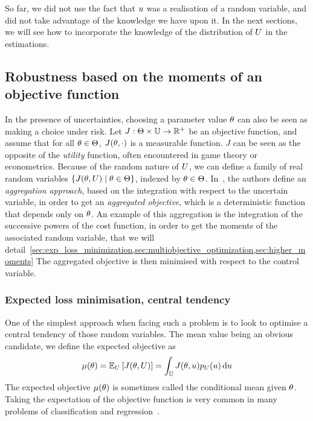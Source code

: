 \documentclass[../../Main_ManuscritThese.tex]{subfiles}
\begin{document}
So far, we did not use the fact that $u$ was a realisation of a
random variable, and did not take advantage of the knowledge we have
upon it. In the next sections, we will see how to incorporate the
knowledge of the distribution of $U$ in the estimations.

\subsection{Robustness based on the moments of an objective function}
In the presence of uncertainties, choosing a parameter value $\theta$ can
also be seen as making a choice under risk. Let
$J:\Theta \times \mathbb{U}\rightarrow \mathbb{R}^+$ be an objective
function, and assume that for all $\theta \in \Theta$, $J(\theta, \cdot)$
is a measurable function.  $J$ can be seen as the opposite of the
\emph{utility} function, often encountered in game theory or
econometrics.  Because of the random nature of $U$, we can define a
family of real random variables $\{J(\theta,U) \mid \theta \in \Theta\}$,
indexed by $\theta \in \Theta$.  In~\cite{beyer_robust_2007}, the
authors define an \emph{aggregation approach}, based on the
integration with respect to the uncertain variable, in order to get an
\emph{aggregated objective}, which is a deterministic function that
depends only on $\theta$.  An example of this aggregation is the
integration of the successive powers of the cost function, in order to
get the moments of the associated random variable, that we will
detail~\cref{sec:exp_loss_minimization,sec:multiobjective_optimization,sec:higher_moments} %
The aggregated objective is then minimised with respect to the control
variable.
\subsubsection{Expected loss minimisation, central tendency}
\label{sec:exp_loss_minimization}
One of the simplest approach when facing such a problem is to look to
optimise a central tendency of those random variables. The mean value
being an obvious candidate, we define the expected objective as
\begin{equation}
  \label{eq:mean_objective}
  \mu(\theta) = \mathbb{E}_U\left[J(\theta,U)\right] =\int_{\mathbb{U}} J(\theta,u)p_U(u)\,\mathrm{d}u
\end{equation}
The expected objective $\mu(\theta)$ is sometimes called the conditional
mean given $\theta$. Taking the expectation of the objective function is
very common in many problems of classification and
regression~\cite{bishop_pattern_2006}.
\end{document}

